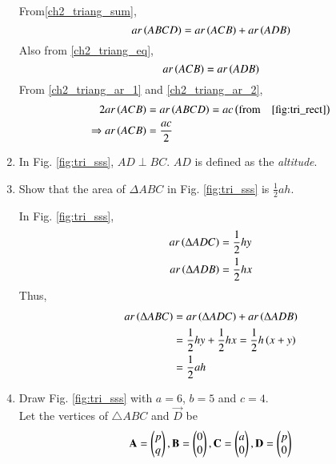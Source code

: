\begin{enumerate}[label=\arabic*.,ref=\thesubsection.\theenumi]
\solution From\eqref{ch2_triang_sum},
\begin{equation}
\label{ch2_triang_ar_1}
ar\left(ABCD\right) = ar\left(ACB\right) + ar\left(ADB\right)
\end{equation}
Also from \eqref{ch2_triang_eq},
\begin{equation}
\label{ch2_triang_ar_2}
ar\left(ACB\right) = ar\left(ADB\right)
\end{equation}
From \eqref{ch2_triang_ar_1} and \eqref{ch2_triang_ar_2},
\begin{align}
2ar\left(ACB\right) &= ar\left(ABCD\right) = ac \left(\text{from} \quad \eqref{fig:tri_rect}\right)
\\
\Rightarrow ar\left(ACB\right) &= \frac{ac}{2}
\label{eq:tri_area_rect}
\end{align}

%
\item In Fig. 	\ref{fig:tri_sss}, $AD \perp BC$.  $AD$ is defined as the {\em altitude}.
\item
	Show that the area of $\Delta ABC$ in Fig. 	\ref{fig:tri_sss}	is $\frac{1}{2}ah$. 


\solution In Fig. \ref{fig:tri_sss},
\begin{align}
ar\left(\Delta ADC\right) &= \frac{1}{2}hy \\
ar\left(\Delta ADB\right) &= \frac{1}{2}hx 
\end{align}
Thus,
\begin{align}
ar\left(\Delta ABC\right) &= ar\left(\Delta ADC\right) + ar\left(\Delta ADB\right) \\
&= \frac{1}{2}hy + \frac{1}{2}hx = \frac{1}{2}h\left(x+y\right) \\
&= \frac{1}{2}ah
\end{align}
%
\item Draw Fig. \ref{fig:tri_sss} with $a=6$, $b=5$  and $c=4$.  
\label{const:tri_sss}
\\
\solution Let the vertices of  $\triangle ABC$ and $\vec{D}$ be 
\begin{align}
\label{eq:tri_basic}
\mathbf{A} = \begin{pmatrix}p\\q\end{pmatrix}, \mathbf{B} = \begin{pmatrix}0\\0\end{pmatrix}, \mathbf{C} = \begin{pmatrix}a\\0\end{pmatrix}, \mathbf{D} = \begin{pmatrix}p\\0\end{pmatrix}
\end{align}
%


\end{enumerate}
